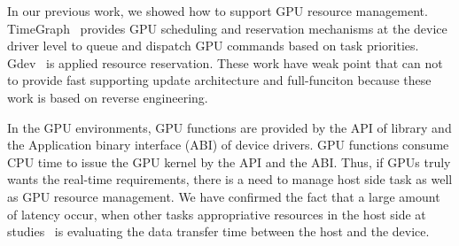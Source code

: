In our previous work,
we showed how to support GPU resource management.
TimeGraph~\cite{kato:timegraph} provides GPU scheduling and reservation mechanisms at the device driver level to queue and dispatch GPU commands based on task priorities.
Gdev~\cite{kato:gdev} is applied resource reservation.
These work have weak point that can not to provide fast supporting update architecture and full-funciton because these work is based on reverse engineering.

In the GPU environments,
GPU functions are provided by the API of library and the Application binary interface (ABI) of device drivers.
GPU functions consume CPU time to issue the GPU kernel by the API and the ABI.
Thus, if GPUs truly wants the real-time requirements,  there is a need to manage host side task as well as GPU resource management.
We have confirmed the fact that a large amount of latency occur,
when other tasks appropriative resources in the host side at studies~\cite{fujii:icpads2013} is evaluating the data transfer time between the host and the device.

